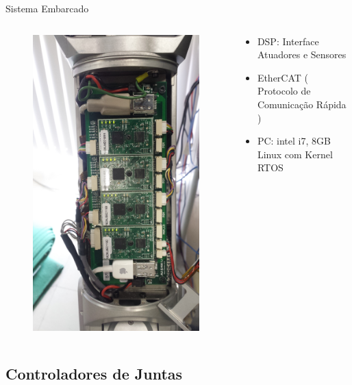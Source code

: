 \documentclass{beamer}
\begin{document}
\begin{frame}{Sistema Embarcado}
\begin{columns}
\begin{column}{0.5\textwidth}  %
\begin{figure}
    \centering
    \includegraphics[width = 0.6\linewidth,height = 1.1 \linewidth]{tex/figs/dsp-control-wrist.jpg}
    \label{fig:mekawristinside}
\end{figure}
\end{column}
\begin{column}{0.5\textwidth}
\begin{itemize}
    \item DSP: Interface Atuadores e Sensores
    \item EtherCAT ( Protocolo de Comunicação Rápida )
    \item PC: intel i7, 8GB Linux com Kernel RTOS
\end{itemize}
\end{column}
\end{columns}
\end{frame}

\subsection{Controladores de Juntas}
\end{document}

